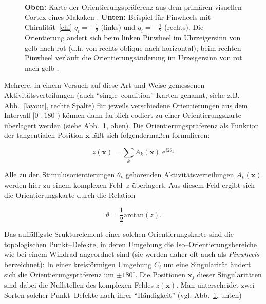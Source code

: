 \begin{figure}[t]
    \centering
    \begin{minipage}{10cm}
    \end{minipage}
    \vskip0.5cm
    \begin{minipage}[b]{4cm}
    \end{minipage}
    \caption{\textbf{Oben:} Karte der Orientierungspräferenz aus dem primären
    visuellen Cortex eines Makaken \parencite[aus][]{blasdel:1992b}.
        \textbf{Unten:} Beispiel für Pinwheels mit Chiralität~\eqref{chi}
        $q_i=+\frac{1}{2}$ (links) und $q_i=-\frac{1}{2}$ (rechts). Die
        Orientierung ändert sich beim linken Pinwheel im Uhrzeigersinn von gelb
        nach rot (d.h. von rechts oblique nach horizontal); beim rechten Pinwheel
        verläuft die Orientierungsänderung im Urzeigersinn von rot nach gelb \parencite[d.h. von horizontal nach rechts oblique; aus][]{bonhoeffer:1991}.}
    \label{opblasdel}
\end{figure}

Mehrere, in einem Versuch auf diese Art und Weise gemessenen
Aktivitäts\-ver\-tei\-lungen (auch ``single--condition'' Karten genannt, siehe
z.B. Abb.~\ref{layout}, rechte Spalte) für jeweils verschiedene
Orientierungen aus dem Intervall $[0^\circ,180^\circ)$ können dann
farblich codiert zu einer Orientierungskarte überlagert werden (siehe
Abb.~\ref{opblasdel}, oben). Die Orientierungspräferenz als Funktion der
tangentialen Position $\mathbf{x}$ läßt sich folgendermaßen formulieren:

\begin{equation*}
    z(\mathbf{x})=\sum\limits_k A_k(\mathbf{x})\; \text{e}^{i2\theta_k}
    \label{zfeld}
\end{equation*}

Alle zu den Stimulusorientierungen $\theta_k$ gehörenden
Aktivitätsverteilungen $A_k(\mathbf{x})$ werden hier zu einem komplexen
Feld~$z$ überlagert. Aus diesem Feld ergibt sich die Orientierungskarte
durch die Relation

\begin{equation*}
    \vartheta=\frac{1}{2}\text{arctan}(z).
\end{equation*}

Das auffälligste Srukturelement einer solchen Orientierungskarte sind die
topologischen Punkt--Defekte, in deren Umgebung die
Iso--Orientierungsbereiche wie bei einem Windrad angeordnet sind (sie
werden daher oft auch als \emph{Pinwheels} berzeichnet): In einer
kreisförmigen Umgebung $C_i$ um eine Singularität ändert sich die
Orientierungspräferenz um $\pm 180^\circ$. Die Positionen $\mathbf{x}_j$
dieser Singularitäten sind dabei die Nullstellen des komplexen Feldes
$z(\mathbf{x})$. Man unterscheidet zwei Sorten solcher Punkt--Defekte nach
ihrer ``Händigkeit'' (vgl. Abb.~\ref{opblasdel}, unten)

